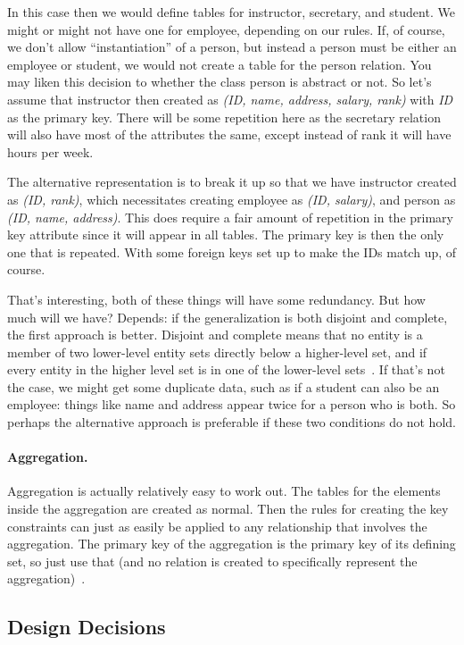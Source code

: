 \documentclass[a4paper]{report}
\begin{document}
In this case then we would define tables for instructor, secretary, and student. We might or might not have one for employee, depending on our rules. If, of course, we don't allow ``instantiation'' of a person, but instead a person must be either an employee or student, we would not create a table for the person relation. You may liken this decision to whether the class person is abstract or not.
So let's assume that instructor then created as \textit{(ID, name, address, salary, rank)} with \textit{ID} as the primary key. There will be some repetition here as the secretary relation will also have most of the attributes the same, except instead of rank it will have hours per week.

The alternative representation is to break it up so that we have instructor created as \textit{(ID, rank)}, which necessitates creating employee as \textit{(ID, salary)}, and person as \textit{(ID, name, address)}. This does require a fair amount of repetition in the primary key attribute since it will appear in all tables. The primary key is then the only one that is repeated. With some foreign keys set up to make the IDs match up, of course.

That's interesting, both of these things will have some redundancy. But how much will we have? Depends: if the generalization is both disjoint and complete, the first approach is better. Disjoint and complete means that no entity is a member of two lower-level entity sets directly below a higher-level set, and if every entity in the higher level set is in one of the lower-level sets~\cite{dsc}. If that's not the case, we might get some duplicate data, such as if a student can also be an employee: things like name and address appear twice for a person who is both. So perhaps the alternative approach is preferable if these two conditions do not hold.

\paragraph{Aggregation.} Aggregation is actually relatively easy to work out. The tables for the elements inside the aggregation are created as normal. Then the rules for creating the key constraints can just as easily be applied to any relationship that involves the aggregation. The primary key of the aggregation is the primary key of its defining set, so just use that (and no relation is created to specifically represent the aggregation)~\cite{dsc}.

\subsection*{Design Decisions}
\end{document}
